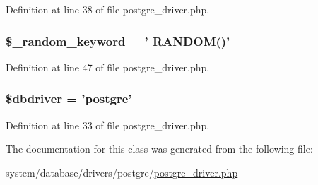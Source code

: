 Definition at line 38 of file postgre\-\_\-driver.\-php.

\hypertarget{class_c_i___d_b__postgre__driver_a10213aa6e05f6d924d3277bb1d2fea00}{
\subsubsection[{\$\-\_\-random\-\_\-keyword}]{\setlength{\rightskip}{0pt plus 5cm}\$\-\_\-random\-\_\-keyword = ' R\-A\-N\-D\-O\-M()'}}\label{class_c_i___d_b__postgre__driver_a10213aa6e05f6d924d3277bb1d2fea00}


Definition at line 47 of file postgre\-\_\-driver.\-php.

\hypertarget{class_c_i___d_b__postgre__driver_a0cde2a16322a023d040aa7f725877597}{
\subsubsection[{\$dbdriver}]{\setlength{\rightskip}{0pt plus 5cm}\$dbdriver = 'postgre'}}\label{class_c_i___d_b__postgre__driver_a0cde2a16322a023d040aa7f725877597}


Definition at line 33 of file postgre\-\_\-driver.\-php.



The documentation for this class was generated from the following file\-:\begin{DoxyCompactItemize}
\item 
system/database/drivers/postgre/\hyperlink{postgre__driver_8php}{postgre\-\_\-driver.\-php}\end{DoxyCompactItemize}
